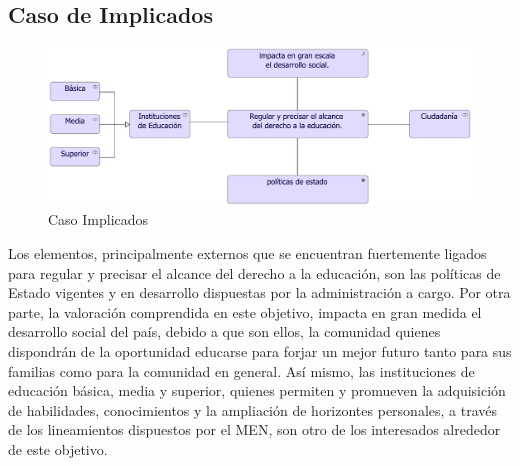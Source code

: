 
\subsection{Caso  de Implicados}
\begin{figure}[h!]
	\centering
	\includegraphics[width=1.0\linewidth]{imgs/motivacion/implicados/imp1.pdf}
	\caption{Caso Implicados}
\end{figure}

Los elementos, principalmente externos que se encuentran fuertemente ligados para regular y precisar el alcance del derecho a la educación, son las políticas de Estado vigentes y en desarrollo dispuestas por la administración a cargo. Por otra parte, la valoración comprendida en este objetivo, impacta en gran medida el desarrollo social del país, debido a que son ellos, la comunidad quienes dispondrán de la oportunidad educarse para forjar un mejor futuro tanto para sus familias como para la comunidad en general. Así mismo, las instituciones de educación básica, media y superior, quienes permiten y promueven la adquisición de habilidades, conocimientos y la ampliación de horizontes personales, a través de los lineamientos dispuestos por el MEN, son otro de los interesados alrededor de este objetivo.